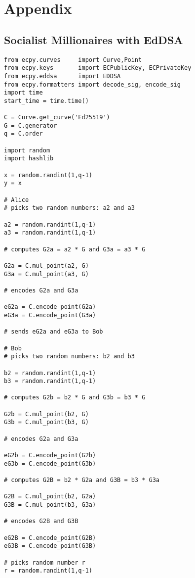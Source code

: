 \chapter*{Appendix}

\section{Socialist Millionaires with EdDSA}

\begin{lstlisting}
from ecpy.curves     import Curve,Point
from ecpy.keys       import ECPublicKey, ECPrivateKey
from ecpy.eddsa      import EDDSA
from ecpy.formatters import decode_sig, encode_sig
import time
start_time = time.time()

C = Curve.get_curve('Ed25519')
G = C.generator
q = C.order

import random
import hashlib

x = random.randint(1,q-1)
y = x

# Alice 
# picks two random numbers: a2 and a3 

a2 = random.randint(1,q-1)
a3 = random.randint(1,q-1)

# computes G2a = a2 * G and G3a = a3 * G 

G2a = C.mul_point(a2, G) 
G3a = C.mul_point(a3, G)

# encodes G2a and G3a

eG2a = C.encode_point(G2a) 
eG3a = C.encode_point(G3a)

# sends eG2a and eG3a to Bob

# Bob 
# picks two random numbers: b2 and b3 

b2 = random.randint(1,q-1)
b3 = random.randint(1,q-1)

# computes G2b = b2 * G and G3b = b3 * G 

G2b = C.mul_point(b2, G)
G3b = C.mul_point(b3, G)

# encodes G2a and G3a

eG2b = C.encode_point(G2b) 
eG3b = C.encode_point(G3b)

# computes G2B = b2 * G2a and G3B = b3 * G3a 

G2B = C.mul_point(b2, G2a) 
G3B = C.mul_point(b3, G3a)

# encodes G2B and G3B

eG2B = C.encode_point(G2B) 
eG3B = C.encode_point(G3B)

# picks random number r 
r = random.randint(1,q-1)


\end{lstlisting}
